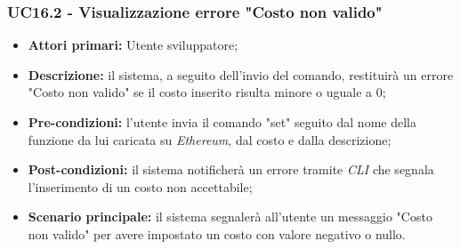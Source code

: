 \subsubsection{UC16.2 - Visualizzazione errore "Costo non valido"}
\begin{itemize}
	\item \textbf{Attori primari:} Utente sviluppatore;
	\item \textbf{Descrizione:} il sistema, a seguito dell'invio del comando, restituirà un errore "Costo non valido" se il costo inserito risulta minore o uguale a 0;
	\item \textbf{Pre-condizioni:}  l'utente invia il comando "set" seguito dal nome della funzione da lui caricata su \textit{Ethereum\glos}, dal costo e dalla descrizione;
	\item \textbf{Post-condizioni:} il sistema notificherà un errore tramite \textit{CLI\glo} che segnala l'inserimento di un costo non accettabile;
	\item \textbf{Scenario principale:} il sistema segnalerà all'utente un messaggio "Costo non valido" per avere impostato un costo con valore negativo o nullo.
\end{itemize}